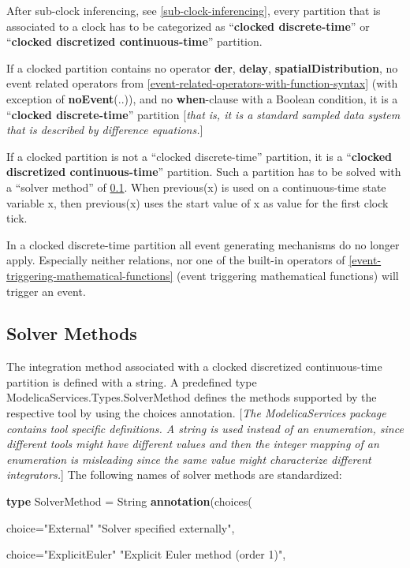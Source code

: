 \documentclass[10pt,a4paper]{report}
\def\doublelabel#1{\label{#1}\hypertarget{#1}{}}
\begin{document}
After sub-clock inferencing, see \ref{sub-clock-inferencing}, every partition that is
associated to a clock has to be categorized as ``\textbf{clocked
discrete-time}'' or ``\textbf{clocked discretized continuous-time}''
partition.

If a clocked partition contains no operator \textbf{der},
\textbf{delay}, \textbf{spatialDistribution}, no event related operators
from \ref{event-related-operators-with-function-syntax} (with exception of \textbf{noEvent}(..)), and no
\textbf{when}-clause with a Boolean condition, it is a ``\textbf{clocked
discrete-time}'' partition {[}\emph{that is, it is a standard sampled
data system that is described by difference equations.}{]}

If a clocked partition is not a ``clocked discrete-time'' partition, it
is a ``\textbf{clocked discretized continuous-time}'' partition. Such a
partition has to be solved with a ``solver method'' of \ref{solver-methods}.
When previous(x) is used on a continuous-time state variable x, then
previous(x) uses the start value of x as value for the first clock tick.

In a clocked discrete-time partition all event generating mechanisms do
no longer apply. Especially neither relations, nor one of the built-in
operators of \ref{event-triggering-mathematical-functions} (event triggering mathematical functions)
will trigger an event.

\subsection{Solver Methods}\doublelabel{solver-methods}

The integration method associated with a clocked discretized
continuous-time partition is defined with a string. A predefined type
ModelicaServices.Types.SolverMethod defines the methods supported by the
respective tool by using the choices annotation. {[}\emph{The
ModelicaServices package contains tool specific definitions. A string is
used instead of an enumeration, since different tools might have
different values and then the integer mapping of an enumeration is
misleading since the same value might characterize different
integrators.}{]} The following names of solver methods are standardized:

\textbf{type} SolverMethod = String \textbf{annotation}(choices(

choice="External" "Solver specified externally",

choice="ExplicitEuler" "Explicit Euler method (order 1)",
\end{document}
